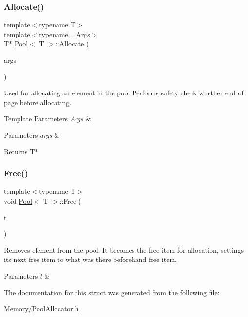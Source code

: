 \subsubsection{\texorpdfstring{Allocate()}{Allocate()}}
{\footnotesize\ttfamily template$<$typename T$>$ \\
template$<$typename... Args$>$ \\
T$\ast$ \hyperlink{structPool}{Pool}$<$ T $>$\+::Allocate (\begin{DoxyParamCaption}\item[{Args \&\&...}]{args }\end{DoxyParamCaption})\hspace{0.3cm}{\ttfamily [inline]}}



Used for allocating an element in the pool Performs safety check whether end of page before allocating. 


\begin{DoxyTemplParams}{Template Parameters}
{\em Args} & \\
\hline
\end{DoxyTemplParams}

\begin{DoxyParams}{Parameters}
{\em args} & \\
\hline
\end{DoxyParams}
\begin{DoxyReturn}{Returns}
T$\ast$ 
\end{DoxyReturn}
\mbox{\label{structPool_ad86e784d5eebc2a5d5a40be6b4a9631f}} 
\subsubsection{\texorpdfstring{Free()}{Free()}}
{\footnotesize\ttfamily template$<$typename T$>$ \\
void \hyperlink{structPool}{Pool}$<$ T $>$\+::Free (\begin{DoxyParamCaption}\item[{T $\ast$}]{t }\end{DoxyParamCaption})\hspace{0.3cm}{\ttfamily [inline]}}



Removes element from the pool. It becomes the free item for allocation, settings its next free item to what was there beforehand free item. 


\begin{DoxyParams}{Parameters}
{\em t} & \\
\hline
\end{DoxyParams}


The documentation for this struct was generated from the following file\+:\begin{DoxyCompactItemize}
\item 
Memory/\hyperlink{PoolAllocator_8h}{Pool\+Allocator.\+h}\end{DoxyCompactItemize}
